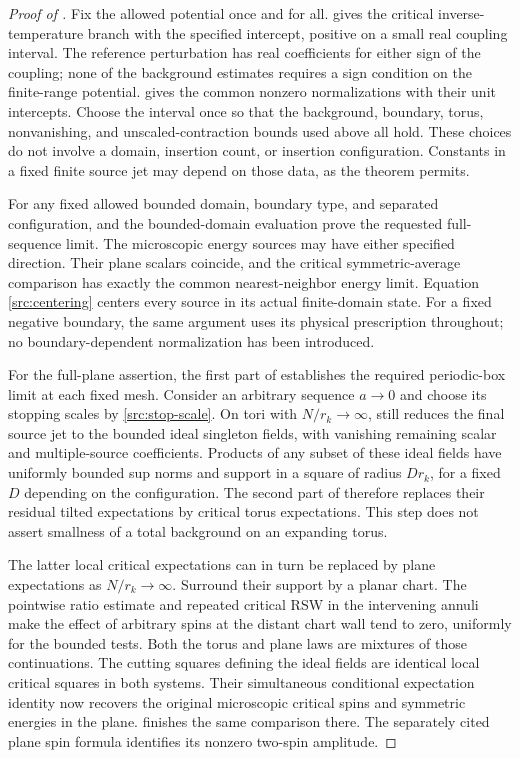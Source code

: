 \begin{proof}[Proof of ]
\label{src:main-proof}
Fix the allowed potential once and for all.  gives
the critical inverse-temperature branch with the specified intercept,
positive on a small real coupling interval. The reference perturbation
has real coefficients for either sign of the coupling; none of the
background estimates requires a sign condition on the finite-range
potential.  gives the common nonzero normalizations
with their unit intercepts. Choose the interval once so that the
background, boundary, torus, nonvanishing, and unscaled-contraction
bounds used above all hold. These choices do not involve a domain,
insertion count, or insertion configuration. Constants in a fixed
finite source jet may depend on those data, as the theorem permits.

For any fixed allowed bounded domain, boundary type, and separated
configuration,  and the bounded-domain evaluation
prove the requested full-sequence limit. The microscopic energy
sources may have either specified direction. Their plane scalars
coincide, and the critical symmetric-average comparison has exactly
the common nearest-neighbor energy limit. Equation
\eqref{src:centering} centers every source in its actual finite-domain
state. For a fixed negative boundary, the same argument uses its
physical prescription throughout; no boundary-dependent normalization
has been introduced.

For the full-plane assertion, the first part of 
establishes the required periodic-box limit at each fixed mesh.
Consider an arbitrary sequence $a\to0$ and choose its stopping scales
by \eqref{src:stop-scale}. On tori with $N/r_k\to\infty$,
 still reduces the final source jet to the bounded
ideal singleton fields, with vanishing remaining scalar and
multiple-source coefficients. Products of any subset of these ideal
fields have uniformly bounded sup norms and support in a square of
radius $D r_k$, for a fixed $D$ depending on the configuration.
The second part of  therefore replaces their residual
tilted expectations by critical torus expectations. This step does
not assert smallness of a total background on an expanding torus.

The latter local critical expectations can in turn be replaced by
plane expectations as $N/r_k\to\infty$. Surround their support by a
planar chart. The pointwise ratio estimate and repeated critical
RSW in the intervening annuli make the effect of arbitrary spins at
the distant chart wall tend to zero, uniformly for the bounded tests.
Both the torus and plane laws are mixtures of those continuations.
The cutting squares defining the ideal fields are identical local
critical squares in both systems. Their simultaneous conditional
expectation identity now recovers the original microscopic critical
spins and symmetric energies in the plane. 
finishes the same comparison there. The separately cited plane spin
formula identifies its nonzero two-spin amplitude.


\end{proof}
